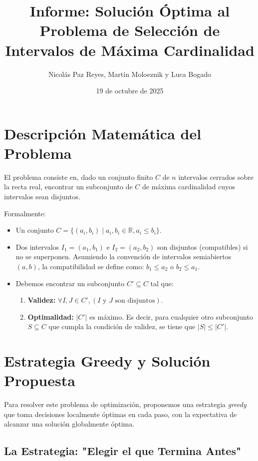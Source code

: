 \documentclass[12pt, a4paper]{article}
\title{Informe: Solución Óptima al Problema de Selección de Intervalos de Máxima Cardinalidad}
\author{Nicolás Paz Reyes, Martín Moloeznik y Luca Bogado}
\date{19 de octubre de 2025}
\begin{document}
\maketitle

\section{Descripción Matemática del Problema}

El problema consiste en, dado un conjunto finito $C$ de $n$ intervalos cerrados sobre la recta real, 
encontrar un subconjunto de $C$ de máxima cardinalidad cuyos intervalos sean disjuntos.

Formalmente:

\begin{itemize}
    \item Un conjunto $C = \{(a_i, b_i) \mid a_i, b_i \in \mathbb{R}, a_i \le b_i\}$.
    
    \item Dos intervalos $I_1 = (a_1, b_1)$ e $I_2 = (a_2, b_2)$ son disjuntos (compatibles) si no se superponen. Asumiendo la convención de intervalos semiabiertos $(a, b)$, la compatibilidad se define como:
    $b_1 \le a_2$ o $b_2 \le a_1$.
    
    \item Debemos encontrar un subconjunto $C' \subseteq C$ tal que:
    \begin{enumerate}
        \item \textbf{Validez:} $\forall I, J \in C', (I \text{ y } J \text{ son disjuntos})$.
        \item \textbf{Optimalidad:} $|C'|$ es máximo. Es decir, para cualquier otro subconjunto $S \subseteq C$ que cumpla la condición de validez, se tiene que $|S| \le |C'|$.
    \end{enumerate}
\end{itemize}

\section{Estrategia Greedy y Solución Propuesta}

Para resolver este problema de optimización, proponemos una estrategia \textit{greedy} 
que toma decisiones localmente óptimas en cada paso, con la expectativa de alcanzar una solución 
globalmente óptima.

\subsection*{La Estrategia: "Elegir el que Termina Antes"}
\end{document}
